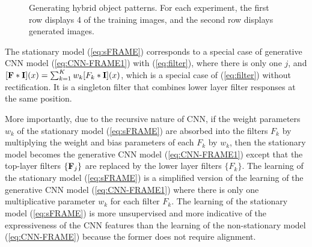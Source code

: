 \documentclass[letterpaper]{article}
\def\I{{\bf I}}
\def\F{{\bf F}}
\begin{document}
\begin{figure}
	\centering
	\setlength{\fboxrule}{1pt}
	\setlength{\fboxsep}{0cm}
	
%	
	\caption{Generating hybrid object patterns.  For each experiment, 
		the first row displays 4 of the training images, and the second row displays generated images.  }
	\label{fig:hybrid1}
\end{figure}




The stationary model (\ref{eq:sFRAME}) corresponds to a special case of  generative CNN model (\ref{eq:CNN-FRAME1}) with (\ref{eq:filter}), where there is only one $j$, and $[\F*\I](x) = \sum_{k=1}^{K} w_k [F_k*\I](x)$, which is a special case of (\ref{eq:filter}) without rectification. It is a singleton filter that combines lower layer filter responses at the same position. 

More importantly, due to the recursive nature of CNN, if the weight parameters $w_k$ of the stationary model  (\ref{eq:sFRAME}) are absorbed into the filters $F_k$ by multiplying the weight and bias parameters of each $F_k$ by $w_k$,  then the stationary model becomes the generative CNN model (\ref{eq:CNN-FRAME1}) except that the top-layer filters $\{\F_j\}$ are replaced by the lower layer filters $\{F_k\}$.  The  learning of  the stationary model  (\ref{eq:sFRAME}) is a simplified version of the learning of the generative CNN model  (\ref{eq:CNN-FRAME1})  where there is only one multiplicative parameter $w_k$  for each filter $F_k$. The learning of  the stationary model  (\ref{eq:sFRAME}) is more unsupervised and more indicative of the expressiveness of the CNN features than the learning of the non-stationary model (\ref{eq:CNN-FRAME}) because the former does not require alignment. 
\end{document}
